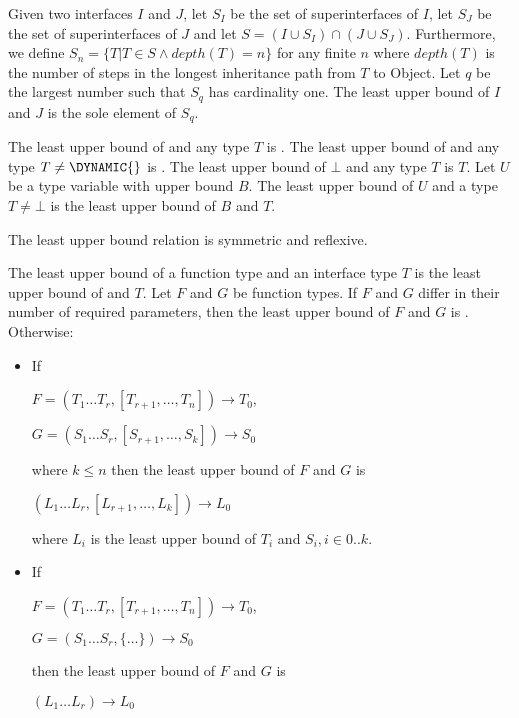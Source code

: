 \documentclass{article}
\newcommand{\code}[1]{{\sf #1}}
\begin{document}
\begin{itemize}
\LMHash{}
Given two interfaces $I$ and $J$, let $S_I$ be the set of superinterfaces of $I$,  let $S_J$ be the set of superinterfaces of $J$ and let $S =  (I \cup S_I) \cap (J \cup S_J)$.  Furthermore, we define $S_n = \{T | T \in S  \wedge depth(T) =n\}$ for any finite $n$ %
where $depth(T)$ is the number of steps in the longest inheritance path from $T$ to \code{Object}. Let $q$ be the largest number such that $S_q$ has cardinality one. The least upper bound of $I$ and $J$ is the sole element of  $S_q$.

\LMHash{}
The least upper bound of \DYNAMIC{} and any type $T$ is \DYNAMIC{}.
The least upper bound of \VOID{} and any type $T \ne \DYNAMIC{}$ is \VOID{}.
The least upper bound of $\bot$ and any type $T$ is $T$.
Let $U$ be a type variable with upper bound $B$. The least upper bound of $U$ and a type $T \ne \bot$ is the least upper bound of $B$ and $T$.

\LMHash{}
The least upper bound relation is symmetric and reflexive.


\LMHash{}
The least upper bound of a function type and an interface type $T$ is the least upper bound of  and $T$.
Let $F$ and $G$ be function types. If $F$ and $G$ differ in their number of required parameters, then the least upper bound of $F$ and $G$ is .  Otherwise:
\begin{itemize}
\item If

$F= (T_1 \ldots T_r, [T_{r+1}, \ldots, T_n]) \longrightarrow T_0$,

$G= (S_1 \ldots S_r, [S_{r+1}, \ldots, S_k]) \longrightarrow S_0$

where $k \le n$ then the least upper bound of $F$ and $G$ is

$(L_1 \ldots L_r, [L_{r+1}, \ldots, L_k]) \longrightarrow L_0$

where $L_i$ is the least upper bound of $T_i$ and $S_i, i \in 0..k$.
\item If

$F= (T_1 \ldots T_r, [T_{r+1}, \ldots, T_n]) \longrightarrow T_0$,

$G= (S_1 \ldots S_r, \{ \ldots \}) \longrightarrow S_0$

then the least upper bound of $F$ and $G$ is

$(L_1 \ldots L_r) \longrightarrow L_0$


\end{itemize}
\end{itemize}
\end{document}
